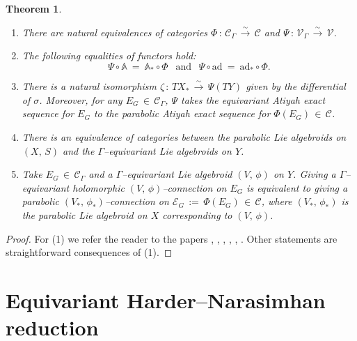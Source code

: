 \documentclass[12pt, reqno]{amsart}
\numberwithin{equation}{section}
\newtheorem{theorem}{Theorem}[section]
\begin{document}
\begin{theorem}\label{char}\mbox{}
\begin{enumerate}
\item There are natural equivalences of categories $\Phi\,:\,\mathscr{C}_{\Gamma}\,\overset{\sim}\longrightarrow
\, \mathscr{C}$ and $\Psi\,:\,\mathscr{V}_{\Gamma}\,\overset{\sim}\longrightarrow \,\mathscr{V}$. 

\item The following equalities of functors hold:
$$\Psi\circ\mathbb{A}\ = \ \mathbb{A}_{*}\circ\Phi\ \ \text{ and }\ \ \Psi\circ\mathrm{ad}\ =\ \mathrm{ad}_{*}\circ\Phi .$$

\item There is a natural isomorphism $\zeta\,:\,TX_{*}\, \overset{\sim}\longrightarrow\, \Psi(TY)$
given by the differential of $\sigma$. Moreover, for any $E_{G}\,\in\, \mathscr{C}_{\Gamma}$,
$\Psi$ takes the equivariant Atiyah exact sequence for 
$E_{G}$ to the parabolic Atiyah exact sequence for $\Phi(E_{G})\,\in\,\mathscr{C}$.

\item There is an equivalence of categories between the parabolic Lie algebroids on $(X,\,S)$ and the
$\Gamma$--equivariant Lie algebroids on $Y$. 

\item Take $E_{G}\,\in\, \mathscr{C}_{\Gamma}$ and a $\Gamma$--equivariant Lie algebroid
$(V,\,\phi)$ on $Y$. Giving a $\Gamma$--equivariant holomorphic $(V,\,\phi)$--connection on $E_{G}$ is equivalent
to giving a parabolic $(V_{*},\, \phi_{*})$--connection on $\mathcal{E}_{G}\,:=\,\Phi(E_{G})\,\in
\, \mathscr{C}$, where $(V_{*},\, \phi_{*})$ is the parabolic Lie algebroid on $X$ corresponding to
$(V,\, \phi)$.
\end{enumerate}
\end{theorem}

\begin{proof}
For (1) we refer the reader to the papers \cite{Bi2}, \cite{Bi3}, \cite{Bo1}, \cite{Bo2}, \cite{BBN1}, \cite{BBN2}.
Other statements are straightforward consequences of (1).
\end{proof}

\section{Equivariant Harder--Narasimhan reduction}\label{fourth}
\end{document}
